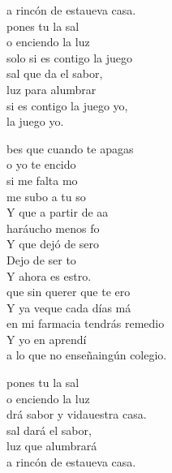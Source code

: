 \documentclass[12pt]{article}
\begin{document}
\begin{multicols*}{2}
\begin{cancion}
\begin{chorus}
	a rincón de estaueva casa.\\
	 pones tu la sal \\
	o enciendo la luz\\
	 solo si es contigo  la juego\\
	 sal que da el sabor, \\
	luz para alumbrar\\
	 si es contigo  la juego yo,\\
	 la juego yo.\\
	\end{chorus}%
	bes que cuando te apagas \\
	o yo te encido\\
	 si me falta mo \\
	me subo a tu so\\
	Y  que a partir de aa \\
	haráucho menos fo \\
	Y  que dejó de sero \\
	Dejo de ser to\\
	Y ahora es estro.\\
	 que sin querer que te ero\\
	Y ya veque cada días má\\
	 en mi farmacia tendrás remedio\\
	Y yo en  aprendí \\
	a lo que no enseñaingún colegio.\\
	\begin{chorus}%
	 pones tu la sal \\
	o enciendo la luz\\
	drá sabor y vidauestra casa.\\
	 sal dará el sabor, \\
	luz que alumbrará\\
	a rincón de estaueva casa.\\

\end{chorus}
\end{cancion}
\end{multicols*}
\end{document}
